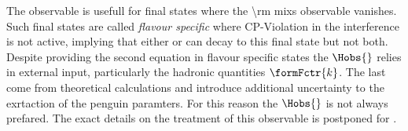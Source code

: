The observable is usefull for final states where the \Acp{\rm mix} observable vanishes. Such final states are called {\it flavour specific}
where CP-Violation in the interference is not active, implying that either \Bs or \Bsb can decay to this final state but not both.
Despite providing the second equation in flavour specific states the $\Hobs{}$ relies in external input, particularly the hadronic quantities $\formFctr{k}$.
The last come from theoretical calculations and introduce additional uncertainty to the exrtaction of the penguin paramters.
For this reason the $\Hobs{}$ is not always prefared. The exact details on the treatment of this observable is postponed for .
